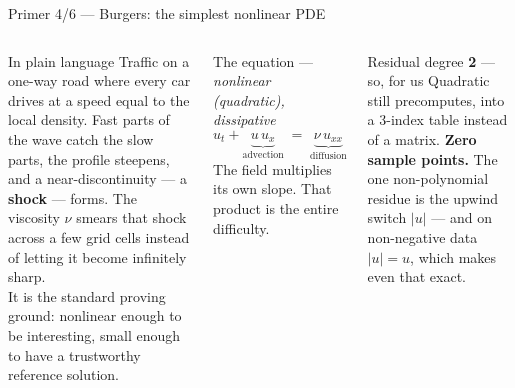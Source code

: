 \documentclass[10pt,aspectratio=169]{beamer}
\begin{document}
\begin{frame}{Primer 4/6 --- Burgers: the simplest nonlinear PDE}
  \footnotesize
  \begin{columns}[T]
    \begin{block}{In plain language}
      Traffic on a one-way road where every car drives at a speed equal to the local density.
      Fast parts of the wave catch the slow parts, the profile steepens, and a near-discontinuity
      --- a \textbf{shock} --- forms. The viscosity $\nu$ smears that shock across a few grid cells
      instead of letting it become infinitely sharp.\\[3pt]
      It is the standard proving ground: nonlinear enough to be interesting, small enough to have a
      trustworthy reference solution.
    \end{block}
    \begin{block}{The equation --- \emph{nonlinear (quadratic), dissipative}}
      \[ u_t + \underbrace{u\,u_x}_{\text{advection}} \;=\; \underbrace{\nu\,u_{xx}}_{\text{diffusion}} \]
      The field multiplies its own slope. That product is the entire difficulty.
    \end{block}
    \begin{exampleblock}{Residual degree \textbf{2} --- so, for us}
      Quadratic still precomputes, into a 3-index table instead of a matrix. \textbf{Zero sample
      points.} The one non-polynomial residue is the upwind switch $|u|$ --- and on non-negative
      data $|u| = u$, which makes even that exact.
    \end{exampleblock}
  \end{columns}
\end{frame}
\end{document}
